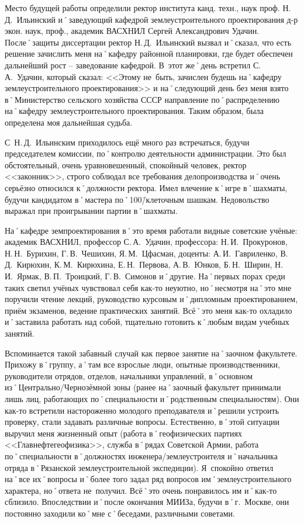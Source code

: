 Место будущей работы определили ректор института канд. техн., наук проф. Н.\,Д.~Ильинский и˚заведующий кафедрой землеустроительного проектирования д-р экон. наук, проф., академик ВАСХНИЛ Сергей Александрович Удачин. После˚защиты диссертации ректор Н.\,Д.~Ильинский вызвал и˚сказал, что есть решение зачислить меня на˚кафедру районной планировки, где будет обеспечен дальнейший рост \--- заведование кафедрой. В~этот же˚день встретил С.\,А.~Удачин, который сказал: <<Этому не~быть, зачислен будешь на˚кафедру землеустроительного проектирования>> и на˚следующий день без меня взято в˚Министерство сельского хозяйства СССР направление по˚распределению на˚кафедру землеустроительного проектирования. Таким образом, была определена моя дальнейшая судьба. 

С~Н.\,Д.~Ильинским приходилось ещё много раз встречаться, будучи председателем комиссии, по˚контролю деятельности администрации. Это был обстоятельный, очень уравновешенный, спокойный человек, ректор <<законник>>, строго соблюдал все требования делопроизводства и˚очень серьёзно относился к˚должности ректора. Имел влечение к˚игре в˚шахматы, будучи кандидатом в˚мастера по˚100\=/клеточным шашкам. Недовольство выражал при проигрывании партии в˚шахматы.

На˚кафедре земпроектирования в˚это время работали видные советские учёные: академик ВАСХНИЛ, профессор С.\,А.~Удачин, профессора: Н.\,И.~Прокуронов, Н.\,Н.~Бурихин, Г.\,В.~Чешихин, Я.\,М.~Цфасман, доценты: А.\,И.~Гавриленко, В.\,Д.~Кирюхин, К.\,М.~Кирюхина, Е.\,Н.~Первова, А.\,В.~Юнков, Б.\,Н.~Ширин, Н.\,И.~Ярмак, В.\,П.~Троицкий, Г.\,В.~Симонов и˚другие. На˚первых порах среди таких светил учёных чувствовал себя как-то неуютно, но˚несмотря на˚это мне поручили чтение лекций, руководство курсовым и˚дипломным проектированием, приём экзаменов, ведение практических занятий. Всё˚это меня как-то охладило и˚заставила работать над собой, тщательно готовить к˚любым видам учебных занятий.

Вспоминается такой забавный случай как первое занятие на˚заочном факультете. Прихожу в˚группу, а˚там все взрослые люди, опытные производственники, руководители отрядов, отделов, начальники управлений, в˚основном из˚Центрально\-/Чернозёмной зоны (ранее на˚заочный факультет принимали лишь лиц, работающих по˚специальности и˚родственным специальностям). Они как-то встретили настороженно молодого преподавателя и˚решили устроить проверку, стали задавать различные вопросы. Естественно, в˚этой ситуации выручил меня жизненный опыт (работа в˚геофизических партиях <<Главнефтегеофизика>>, служба в˚рядах Советской Армии, работа по˚специальности в˚должностях инженера\-/землеустроителя и˚начальника отряда в˚Рязанской землеустроительной экспедиции). Я~спокойно ответил на˚все их˚вопросы и˚более того задал ряд вопросов им˚землеустроительного характера, но˚ответа не~получил. Всё˚это очень понравилось им и˚как-то сблизило. Впоследствии и˚после окончания МИИЗа, будучи в˚г.~Москве, они постоянно заходили ко˚мне с˚беседами, различными советами. 

